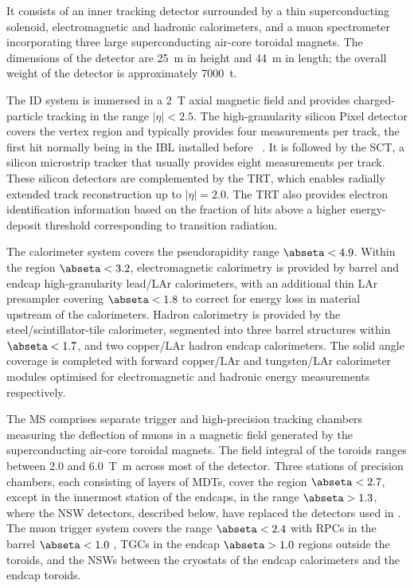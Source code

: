 \documentclass[cernpreprint, atlasdraft=false, UKenglish,british,orcidlogo, texmf, orcidlogo]{atlasdoc}
\begin{document}
It consists of an inner tracking detector surrounded by a thin superconducting solenoid, electromagnetic and hadronic calorimeters,
and a muon spectrometer incorporating three large superconducting air-core toroidal magnets. The dimensions of the detector are \SI{25}{\m} in height and \SI{44}{\m} in length; the overall weight of the detector is approximately \SI{7000}{\tonne}.
 
The \gls{ID} system is immersed in a \SI{2}{\tesla} axial magnetic field
and provides charged-particle tracking in the range \(|\eta| < 2.5\).
The high-granularity silicon \gls{Pixel} detector covers the vertex region and typically provides four measurements per track,
the first hit normally being in the \gls{IBL} installed before \RunTwo~\cite{ATLAS-TDR-19,PIX-2018-001}.
It is followed by the \gls{SCT}, a silicon microstrip tracker that usually provides eight measurements per track.
These silicon detectors are complemented by the \gls{TRT},
which enables radially extended track reconstruction up to \(|\eta| = 2.0\).
The \gls{TRT} also provides electron identification information
based on the fraction of hits above a higher energy-deposit threshold corresponding to transition radiation.
 
The calorimeter system covers the pseudorapidity range \(\abseta < 4.9\).
Within the region \(\abseta< 3.2\), electromagnetic calorimetry is provided by barrel and
endcap high-granularity lead/\gls{LAr} calorimeters,
with an additional thin \gls{LAr} presampler covering \(\abseta < 1.8\)
to correct for energy loss in material upstream of the calorimeters.
Hadron calorimetry is provided by the steel/scintillator-tile calorimeter,
segmented into three barrel structures within \(\abseta < 1.7\), and two copper/\gls{LAr} hadron endcap calorimeters.
The solid angle coverage is completed with forward copper/\gls{LAr} and tungsten/\gls{LAr} calorimeter modules
optimised for electromagnetic and hadronic energy measurements respectively.
 
The \gls{MS} comprises separate trigger and
high-precision tracking chambers measuring the deflection of muons in a magnetic field generated by the superconducting air-core toroidal magnets.
The field integral of the toroids ranges between \num{2.0} and \SI{6.0}{\tesla\metre}
across most of the detector.
Three stations of precision chambers, each consisting of layers of \glspl{MDT}, cover the region \(\abseta < 2.7\),
except in the innermost station of the endcaps, in the range $\abseta>1.3$, where the \gls{NSW} detectors, described below, have replaced the detectors used in \RunOneTwo. 
The muon trigger system covers the range \(\abseta < 2.4\) with \glspl{RPC} in the barrel  \(\abseta < 1.0\) , \glspl{TGC} in the endcap  \(\abseta > 1.0\) regions outside the toroids, and the \glspl{NSW} between the cryostats of the endcap calorimeters and the endcap toroids. 
 
\end{document}
